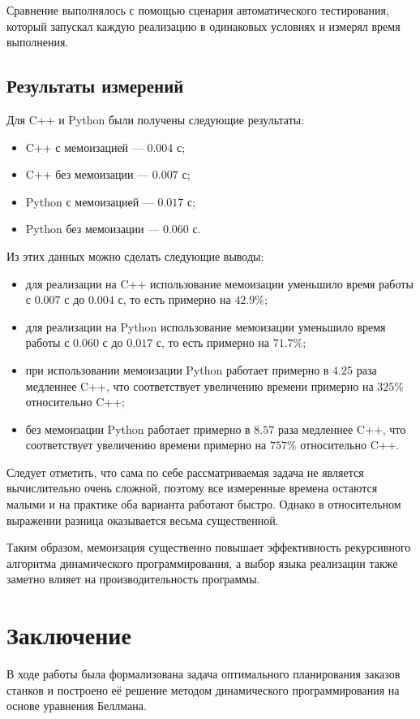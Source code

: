 \documentclass[a4paper,12pt]{article}
\begin{document}
Сравнение выполнялось с помощью сценария автоматического тестирования, который запускал каждую реализацию в одинаковых условиях и измерял время выполнения.

\subsection{Результаты измерений}
Для C++ и Python были получены следующие результаты:
\begin{itemize}
    \item C++ с мемоизацией --- $0.004$ с;
    \item C++ без мемоизации --- $0.007$ с;
    \item Python с мемоизацией --- $0.017$ с;
    \item Python без мемоизации --- $0.060$ с.
\end{itemize}

Из этих данных можно сделать следующие выводы:
\begin{itemize}
    \item для реализации на C++ использование мемоизации уменьшило время работы с $0.007$ с до $0.004$ с, то есть примерно на $42.9\%$;
    \item для реализации на Python использование мемоизации уменьшило время работы с $0.060$ с до $0.017$ с, то есть примерно на $71.7\%$;
    \item при использовании мемоизации Python работает примерно в $4.25$ раза медленнее C++, что соответствует увеличению времени примерно на $325\%$ относительно C++;
    \item без мемоизации Python работает примерно в $8.57$ раза медленнее C++, что соответствует увеличению времени примерно на $757\%$ относительно C++.
\end{itemize}

Следует отметить, что сама по себе рассматриваемая задача не является вычислительно очень сложной, поэтому все измеренные времена остаются малыми и на практике оба варианта работают быстро. Однако в относительном выражении разница оказывается весьма существенной.

Таким образом, мемоизация существенно повышает эффективность рекурсивного алгоритма динамического программирования, а выбор языка реализации также заметно влияет на производительность программы.
\section{Заключение}
В ходе работы была формализована задача оптимального планирования заказов станков и построено её решение методом динамического программирования на основе уравнения Беллмана.
\end{document}
